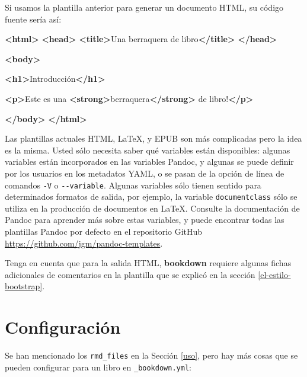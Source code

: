 \documentclass[12pt,]{krantz}
\makeatletter
\newenvironment{Shaded}{\begin{snugshade}}{\end{snugshade}}
\newcommand{\KeywordTok}[1]{\textcolor[rgb]{0.13,0.29,0.53}{\textbf{{#1}}}}
\newcommand{\NormalTok}[1]{{#1}}
\newenvironment{kframe}{%
\medskip{}
\setlength{\fboxsep}{.8em}
 \def\at@end@of@kframe{}%
 \ifinner\ifhmode%
  \def\at@end@of@kframe{\end{minipage}}%
  \begin{minipage}{\columnwidth}%
 \fi\fi%
 \def\FrameCommand##1{\hskip\@totalleftmargin \hskip-\fboxsep
 \colorbox{shadecolor}{##1}\hskip-\fboxsep
     \hskip-\linewidth \hskip-\@totalleftmargin \hskip\columnwidth}%
 \MakeFramed {\advance\hsize-\width
   \@totalleftmargin\z@ \linewidth\hsize
   \@setminipage}}%
 {\par\unskip\endMakeFramed%
 \at@end@of@kframe}
\renewenvironment{Shaded}{\begin{kframe}}{\end{kframe}}
\theoremstyle{definition}
\theoremstyle{definition}
\theoremstyle{remark}
\makeatother
\begin{document}
Si usamos la plantilla anterior para generar un documento HTML, su
código fuente sería así:

\begin{Shaded}
\begin{Highlighting}[]
\KeywordTok{<html>}
  \KeywordTok{<head>}
    \KeywordTok{<title>}\NormalTok{Una berraquera de libro}\KeywordTok{</title>}
  \KeywordTok{</head>}
  
  \KeywordTok{<body>}
  
  \KeywordTok{<h1>}\NormalTok{Introducción}\KeywordTok{</h1>}
  
  \KeywordTok{<p>}\NormalTok{Este es una }\KeywordTok{<strong>}\NormalTok{berraquera}\KeywordTok{</strong>} \NormalTok{de libro!}\KeywordTok{</p>}
  
  \KeywordTok{</body>}
\KeywordTok{</html>}
\end{Highlighting}
\end{Shaded}

Las plantillas actuales HTML, LaTeX, y EPUB son más complicadas pero la
idea es la misma. Usted sólo necesita saber qué variables están
disponibles: algunas variables están incorporados en las variables
Pandoc, y algunas se puede definir por los usuarios en los metadatos
YAML, o se pasan de la opción de línea de comandos \texttt{-V} o
\texttt{-\/-variable}. Algunas variables sólo tienen sentido para
determinados formatos de salida, por ejemplo, la variable
\texttt{documentclass} sólo se utiliza en la producción de documentos en
LaTeX. Consulte la documentación de Pandoc para aprender más sobre estas
variables, y puede encontrar todas las plantillas Pandoc por defecto en
el repositorio GitHub \url{https://github.com/jgm/pandoc-templates}.

Tenga en cuenta que para la salida HTML, \textbf{bookdown} requiere
algunas fichas adicionales de comentarios en la plantilla que se explicó
en la sección \ref{el-estilo-bootstrap}.

\section{Configuración}\label{configuracion}

Se han mencionado los \texttt{rmd\_files} en la Sección \ref{uso}, pero
hay más cosas que se pueden configurar para un libro en
\texttt{\_bookdown.yml}:
\end{document}
